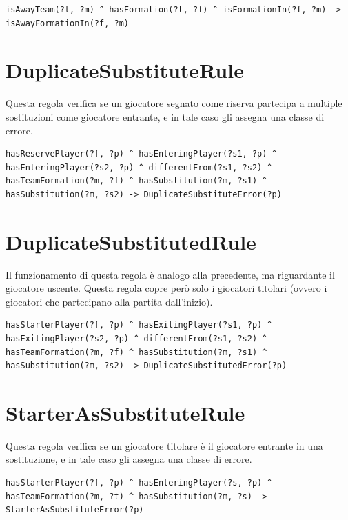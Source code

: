 \documentclass[11pt]{report} %
\begin{document}
\begin{lstlisting}[language=SWRL]
isAwayTeam(?t, ?m) ^ hasFormation(?t, ?f) ^ isFormationIn(?f, ?m) -> isAwayFormationIn(?f, ?m)
\end{lstlisting}

\newpage

\section{DuplicateSubstituteRule}

Questa regola verifica se un giocatore segnato come riserva partecipa a multiple sostituzioni come giocatore entrante, e in tale caso gli assegna una classe di errore.

\begin{lstlisting}[language=SWRL]
hasReservePlayer(?f, ?p) ^ hasEnteringPlayer(?s1, ?p) ^ hasEnteringPlayer(?s2, ?p) ^ differentFrom(?s1, ?s2) ^ hasTeamFormation(?m, ?f) ^ hasSubstitution(?m, ?s1) ^ hasSubstitution(?m, ?s2) -> DuplicateSubstituteError(?p)
\end{lstlisting}

\section{DuplicateSubstitutedRule}

Il funzionamento di questa regola è analogo alla precedente, ma riguardante il giocatore uscente.
Questa regola copre però solo i giocatori titolari (ovvero i giocatori che partecipano alla partita dall'inizio).

\begin{lstlisting}[language=SWRL]
hasStarterPlayer(?f, ?p) ^ hasExitingPlayer(?s1, ?p) ^ hasExitingPlayer(?s2, ?p) ^ differentFrom(?s1, ?s2) ^ hasTeamFormation(?m, ?f) ^ hasSubstitution(?m, ?s1) ^ hasSubstitution(?m, ?s2) -> DuplicateSubstitutedError(?p)
\end{lstlisting}

\section{StarterAsSubstituteRule}

Questa regola verifica se un giocatore titolare è il giocatore entrante in una sostituzione, e in tale caso gli assegna una classe di errore.

\begin{lstlisting}[language=SWRL]
hasStarterPlayer(?f, ?p) ^ hasEnteringPlayer(?s, ?p) ^ hasTeamFormation(?m, ?t) ^ hasSubstitution(?m, ?s) -> StarterAsSubstituteError(?p)
\end{lstlisting}
\end{document}

